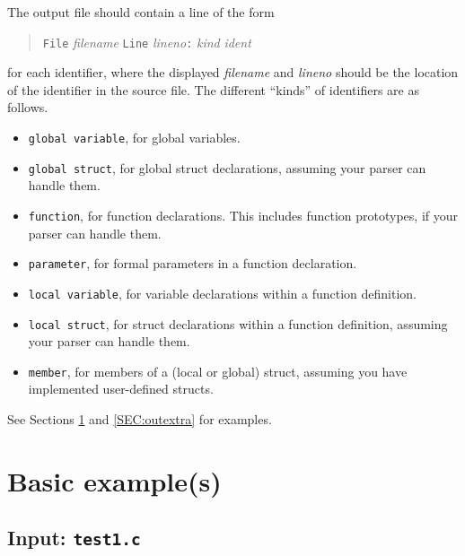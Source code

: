\documentclass{article}
\begin{document}
The output file should contain a line of the form
\begin{quote}
  {\tt File} \emph{filename} {\tt Line} \emph{lineno}{\tt :}
  \emph{kind} \emph{ident}
\end{quote}
for each identifier,
where the displayed \emph{filename} and \emph{lineno} should
be the location of the identifier in the source file.
The different ``kinds'' of identifiers are as follows.
\begin{itemize}
  \item {\tt global variable}, for global variables.

  \item {\tt global struct}, for global struct declarations,
    assuming your parser can handle them.

  \item {\tt function}, for function declarations.
    This includes function prototypes, if your parser can handle them.

  \item {\tt parameter}, for formal parameters in a function declaration.

  \item {\tt local variable}, for variable declarations
    within a function definition.

  \item {\tt local struct}, for struct declarations
    within a function definition,
    assuming your parser can handle them.

  \item {\tt member}, for members of a (local or global) struct,
    assuming you have implemented user-defined structs.

\end{itemize}
See Sections \ref{SEC:outbasic} and \ref{SEC:outextra} for examples.

\section{Basic example(s)} \label{SEC:outbasic}

\subsection{Input: {\tt test1.c}}


\end{document}
